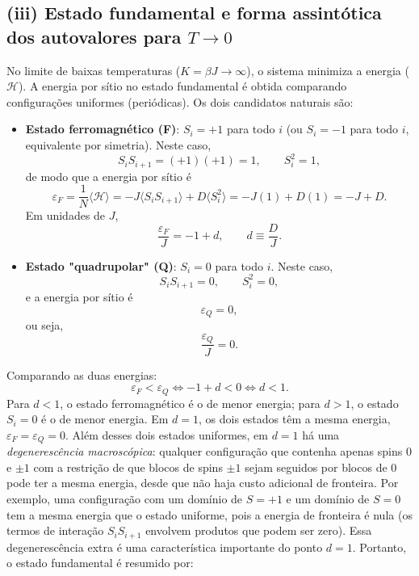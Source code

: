 \documentclass[11pt,a4paper]{article}
\begin{document}
\subsection*{(iii) Estado fundamental e forma assintótica dos autovalores para $T\to0$}
%
No limite de baixas temperaturas ($K = \beta J \to \infty$), o sistema minimiza a energia ($\mathcal H$). A energia por sítio no estado fundamental é obtida comparando configurações uniformes (periódicas). Os dois candidatos naturais são:
%
\begin{itemize}
    \item  \textbf{Estado ferromagnético (F)}: $S_i = +1$ para todo $i$ (ou $S_i = -1$ para todo $i$, equivalente por simetria). Neste caso,
    \begin{equation}
        S_i S_{i+1} = (+1)(+1) = 1, \qquad S_i^2 = 1,
    \end{equation}
    de modo que a energia por sítio é
    \begin{equation}
        \varepsilon_F = \frac{1}{N} \langle \mathcal H \rangle
        = -J \langle S_i S_{i+1} \rangle + D \langle S_i^2 \rangle
        = -J(1) + D(1) = -J + D.
    \end{equation}
    Em unidades de $J$,
    \begin{equation}
        \frac{\varepsilon_F}{J} = -1 + d, \qquad d \equiv \frac{D}{J}.
    \end{equation}
    \item \textbf{Estado "quadrupolar" (Q)}: $S_i = 0$ para todo $i$. Neste caso,
    \begin{equation}
        S_i S_{i+1} = 0, \qquad S_i^2 = 0,
    \end{equation}
    e a energia por sítio é
    \begin{equation}
        \varepsilon_Q = 0,
    \end{equation}
    ou seja,
    \begin{equation}
        \frac{\varepsilon_Q}{J} = 0.
    \end{equation}
\end{itemize}
%
Comparando as duas energias:
%
\begin{equation}
    \varepsilon_F < \varepsilon_Q \iff -1 + d < 0 \iff d < 1.
\end{equation}
%
Para $d < 1$, o estado ferromagnético é o de menor energia; para $d > 1$, o estado $S_i = 0$ é o de menor energia. Em $d = 1$, os dois estados têm a mesma energia, $\varepsilon_F = \varepsilon_Q = 0$. Além desses dois estados uniformes, em $d = 1$ há uma \emph{degenerescência macroscópica}: qualquer configuração que contenha apenas spins $0$ e $\pm 1$ com a restrição de que blocos de spins $\pm 1$ sejam seguidos por blocos de $0$ pode ter a mesma energia, desde que não haja custo adicional de fronteira. Por exemplo, uma configuração com um domínio de $S=+1$ e um domínio de $S=0$ tem a mesma energia que o estado uniforme, pois a energia de fronteira é nula (os termos de interação $S_i S_{i+1}$ envolvem produtos que podem ser zero). Essa degenerescência extra é uma característica importante do ponto $d=1$. Portanto, o estado fundamental é resumido por:
\end{document}
